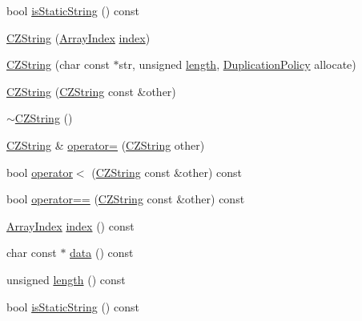 \begin{DoxyCompactItemize}
\item 
bool \hyperlink{class_json_1_1_value_1_1_c_z_string_a5991dfa2f6c2ba318373c7429fcd7a57}{is\+Static\+String} () const
\item 
\hyperlink{class_json_1_1_value_1_1_c_z_string_a4b8aa6eaabdec78cffec96e088da996f}{C\+Z\+String} (\hyperlink{class_json_1_1_value_a184a91566cccca7b819240f0d5561c7d}{Array\+Index} \hyperlink{class_json_1_1_value_1_1_c_z_string_a0f3ba09401525d4f01dafd577122ee32}{index})
\item 
\hyperlink{class_json_1_1_value_1_1_c_z_string_a86a86eaf0cf26d4c861d0daa359d608a}{C\+Z\+String} (char const $\ast$str, unsigned \hyperlink{class_json_1_1_value_1_1_c_z_string_aa7ee665d162c1f33b3ec818e289d8a5e}{length}, \hyperlink{class_json_1_1_value_1_1_c_z_string_a2805c46fb4a72bbaed55de6d75941b6d}{Duplication\+Policy} allocate)
\item 
\hyperlink{class_json_1_1_value_1_1_c_z_string_a9685070d440335b55ef5c85747d25157}{C\+Z\+String} (\hyperlink{class_json_1_1_value_1_1_c_z_string}{C\+Z\+String} const \&other)
\item 
\hyperlink{class_json_1_1_value_1_1_c_z_string_add6989dc7073646b95e5ebacb3f07d51}{$\sim$\+C\+Z\+String} ()
\item 
\hyperlink{class_json_1_1_value_1_1_c_z_string}{C\+Z\+String} \& \hyperlink{class_json_1_1_value_1_1_c_z_string_aa810044a74c73d58153639a2affa013f}{operator=} (\hyperlink{class_json_1_1_value_1_1_c_z_string}{C\+Z\+String} other)
\item 
bool \hyperlink{class_json_1_1_value_1_1_c_z_string_ae023bb91b4b4520c82d5e6e4da8c310a}{operator$<$} (\hyperlink{class_json_1_1_value_1_1_c_z_string}{C\+Z\+String} const \&other) const
\item 
bool \hyperlink{class_json_1_1_value_1_1_c_z_string_ad41766c98fc6a6d5fcd72aaf78fc5db0}{operator==} (\hyperlink{class_json_1_1_value_1_1_c_z_string}{C\+Z\+String} const \&other) const
\item 
\hyperlink{class_json_1_1_value_a184a91566cccca7b819240f0d5561c7d}{Array\+Index} \hyperlink{class_json_1_1_value_1_1_c_z_string_a0f3ba09401525d4f01dafd577122ee32}{index} () const
\item 
char const  $\ast$ \hyperlink{class_json_1_1_value_1_1_c_z_string_a606392bc1abed23d1387bf972bfd24ca}{data} () const
\item 
unsigned \hyperlink{class_json_1_1_value_1_1_c_z_string_aa7ee665d162c1f33b3ec818e289d8a5e}{length} () const
\item 
bool \hyperlink{class_json_1_1_value_1_1_c_z_string_a5991dfa2f6c2ba318373c7429fcd7a57}{is\+Static\+String} () const
\end{DoxyCompactItemize}
